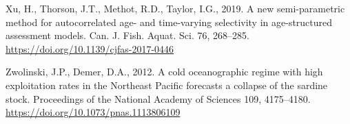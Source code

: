 \documentclass[]{article}
\begin{document}
\leavevmode\hypertarget{ref-xu2019New}{}%
Xu, H., Thorson, J.T., Methot, R.D., Taylor, I.G., 2019. A new
semi-parametric method for autocorrelated age- and time-varying
selectivity in age-structured assessment models. Can. J. Fish. Aquat.
Sci. 76, 268--285. \url{https://doi.org/10.1139/cjfas-2017-0446}

\leavevmode\hypertarget{ref-zwolinski2012Cold}{}%
Zwolinski, J.P., Demer, D.A., 2012. A cold oceanographic regime with
high exploitation rates in the Northeast Pacific forecasts a collapse of
the sardine stock. Proceedings of the National Academy of Sciences 109,
4175--4180. \url{https://doi.org/10.1073/pnas.1113806109}

\pagebreak

\begin{landscape}
\begin{table}


\end{table}
\end{landscape}
\end{document}
